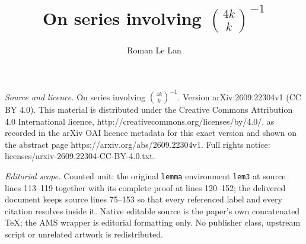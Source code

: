 \documentclass[10pt,a4paper]{amsart}
\numberwithin{equation}{section}
\begin{document}
\title[On series involving binom4kk^-1]{On series involving $\binom{4k}{k}^{-1}$}
\author{Roman Le Lan}
\date{}
\maketitle
\noindent\emph{Source and licence.} On series involving $\binom{4k}{k}^{-1}$. Version arXiv:2609.22304v1 (CC BY 4.0). This material is distributed under the Creative Commons Attribution 4.0 International licence, http://creativecommons.org/licenses/by/4.0/, as recorded in the arXiv OAI licence metadata for this exact version and shown on the abstract page https://arxiv.org/abs/2609.22304v1. Full rights notice: licenses/arxiv-2609.22304-CC-BY-4.0.txt.\par\smallskip
\noindent\textit{Editorial scope.} Counted unit: the original \texttt{lemma} environment \texttt{lem3} at source lines 113--119 together with its complete proof at lines 120--152; the delivered document keeps source lines 75--153 so that every referenced label and every citation resolves inside it. Native editable source is the paper's own concatenated TeX; the AMS wrapper is editorial formatting only. No publisher class, upstream script or unrelated artwork is redistributed.
\end{document}
